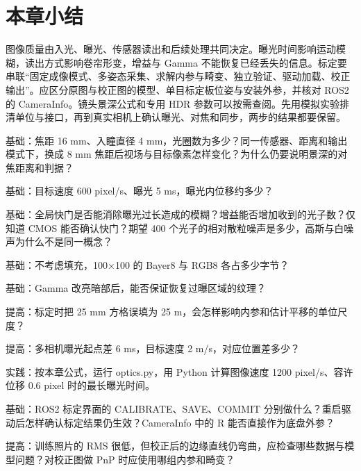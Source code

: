 \section{本章小结}
\begin{conclusion}
图像质量由入光、曝光、传感器读出和后续处理共同决定。曝光时间影响运动模糊，读出方式影响卷帘形变，增益与 Gamma 不能恢复已经丢失的信息。标定要串联“固定成像模式、多姿态采集、求解内参与畸变、独立验证、驱动加载、校正输出”。应区分原图与校正图的模型、单目标定板位姿与安装外参，并核对 ROS2 的 CameraInfo。镜头景深公式和专用 HDR 参数可以按需查阅。先用模拟实验排清单位与接口，再到真实相机上确认曝光、对焦和同步，两步的结果都要保留。
\end{conclusion}

\begin{problemset}
\item \label{prob:v2-camera-aperture}基础：焦距 16 mm、入瞳直径 4 mm，光圈数为多少？同一传感器、距离和输出模式下，换成 8 mm 焦距后视场与目标像素怎样变化？为什么仍要说明景深的对焦距离和判据？
\item \label{prob:v2-camera-motion}基础：目标速度 600 pixel/s、曝光 5 ms，曝光内位移约多少？
\item \label{prob:v2-camera-shutter}基础：全局快门是否能消除曝光过长造成的模糊？增益能否增加收到的光子数？仅知道 CMOS 能否确认快门？期望 400 个光子的相对散粒噪声是多少，高斯与白噪声为什么不是同一概念？
\item \label{prob:v2-camera-bytes}基础：不考虑填充，100×100 的 Bayer8 与 RGB8 各占多少字节？
\item \label{prob:v2-camera-gamma}基础：Gamma 改亮暗部后，能否保证恢复过曝区域的纹理？
\item \label{prob:v2-camera-scale}提高：标定时把 25 mm 方格误填为 25 m，会怎样影响内参和估计平移的单位尺度？
\item \label{prob:v2-camera-sync}提高：多相机曝光起点差 6 ms，目标速度 2 m/s，对应位置差多少？
\item \label{prob:v2-camera-budget}实践：按本章公式，运行 optics.py，用 Python 计算图像速度 1200 pixel/s、容许位移 0.6 pixel 时的最长曝光时间。
\item \label{prob:v2-camera-ros}基础：ROS2 标定界面的 CALIBRATE、SAVE、COMMIT 分别做什么？重启驱动后怎样确认标定结果仍生效？CameraInfo 中的 R 能否直接作为底盘外参？
\item \label{prob:v2-camera-validation}提高：训练照片的 RMS 很低，但校正后的边缘直线仍弯曲，应检查哪些数据与模型问题？对校正图做 PnP 时应使用哪组内参和畸变？
\end{problemset}


